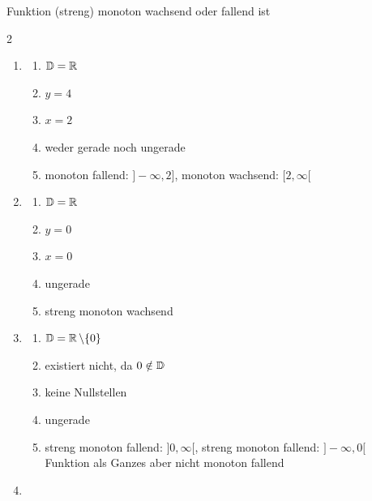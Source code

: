 \begin{enumerate}
\begin{enumerate}[label=\roman*)]
                    Funktion (streng) monoton wachsend oder fallend ist
          \end{enumerate}
          \begin{multicols}{2}
              \begin{enumerate}
                  \item \begin{enumerate}[label=\roman*)]
                            \item $\operatorname{\mathbb{D}}=\operatorname{\mathbb{R}}$
                            \item $y=4$
                            \item $x = 2$
                            \item weder gerade noch ungerade
                            \item monoton fallend: $]-\infty, 2]$, monoton wachsend: $[2, \infty[$
                        \end{enumerate}
                  \item \begin{enumerate}[label=\roman*)]
                            \item $\operatorname{\mathbb{D}}=\operatorname{\mathbb{R}}$
                            \item $y=0$
                            \item $x = 0$
                            \item ungerade
                            \item streng monoton wachsend
                        \end{enumerate}\columnbreak
                  \item \begin{enumerate}[label=\roman*)]
                            \item $\operatorname{\mathbb{D}}=\operatorname{\mathbb{R}} \setminus \{0\}$
                            \item existiert nicht, da $0\notin \operatorname{\mathbb{D}}$
                            \item keine Nullstellen
                            \item ungerade
                            \item streng monoton fallend: $]0, \infty[$, streng monoton fallend: $]-\infty, 0[$\\
                                  Funktion als Ganzes aber nicht monoton fallend
                        \end{enumerate}
                  \item \begin{enumerate}[label=\roman*)]

\end{enumerate}
\end{enumerate}
\end{multicols}
\end{enumerate}
